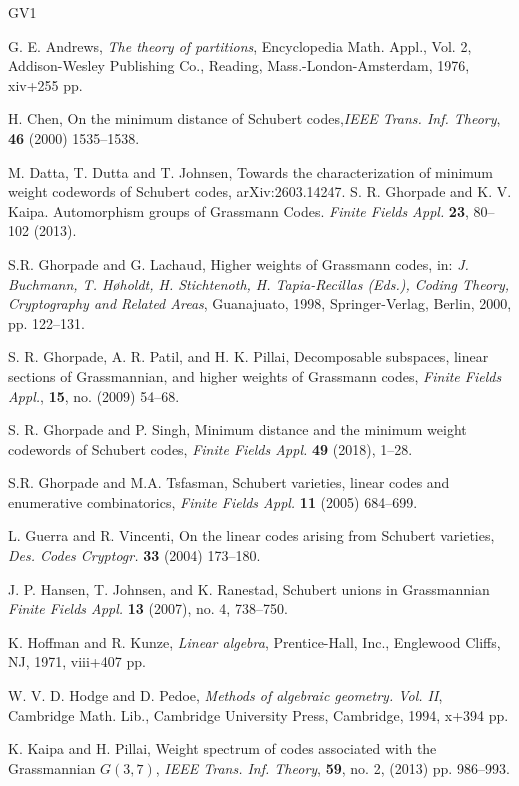 \documentclass[10pt,a4paper,oneside]{amsproc}
\begin{document}
\begin{thebibliography}{GV1}

G. E. Andrews,
\textit{The theory of partitions},
Encyclopedia Math. Appl., Vol. 2,
Addison-Wesley Publishing Co., Reading, Mass.-London-Amsterdam, 1976, xiv+255 pp.



H. Chen, On the minimum distance of Schubert codes,\emph{IEEE Trans. Inf. Theory}, {\bf 46} (2000) 1535–1538.


M. Datta, T. Dutta and T. Johnsen, Towards the characterization of minimum weight codewords of Schubert codes, arXiv:2603.14247.
S. R. Ghorpade and K. V. Kaipa. Automorphism groups of Grassmann Codes. \emph{Finite Fields Appl.} {\bf 23}, 80–102 (2013).

S.R. Ghorpade and G. Lachaud, Higher weights of Grassmann codes, in: \emph{J. Buchmann, T. Høholdt, H. Stichtenoth, H. Tapia-Recillas (Eds.), Coding Theory, Cryptography and Related Areas}, Guanajuato, 1998, Springer-Verlag, Berlin, 2000, pp. 122–131.

S. R. Ghorpade, A. R. Patil, and H. K. Pillai, Decomposable subspaces, linear sections of Grassmannian, and higher weights of Grassmann codes, \emph{Finite Fields Appl.},  {\bf 15}, no. (2009) 54–68. 


S. R. Ghorpade and P. Singh,
 Minimum distance and the minimum weight codewords of Schubert codes,
\emph{Finite Fields Appl.} {\bf 49} (2018), 1–28.


S.R. Ghorpade and M.A. Tsfasman, Schubert varieties, linear codes and enumerative combinatorics, \emph{Finite Fields Appl.} {\bf 11} (2005) 684–699. 

L. Guerra and R. Vincenti, On the linear codes arising from Schubert varieties, \emph{Des. Codes Cryptogr.} {\bf 33} (2004) 173–180.

J. P. Hansen, T. Johnsen, and K. Ranestad,
Schubert unions in Grassmannian
\emph{Finite Fields Appl.} {\bf 13} (2007), no. 4, 738–750.

K. Hoffman and R. Kunze,
\textit{Linear algebra},
Prentice-Hall, Inc., Englewood Cliffs, NJ, 1971, viii+407 pp.

W. V. D. Hodge and D. Pedoe,
\textit{Methods of algebraic geometry. Vol. II},
Cambridge Math. Lib.,
Cambridge University Press, Cambridge, 1994, x+394 pp.

K. Kaipa and H. Pillai, Weight spectrum of codes associated with the Grassmannian $G(3, 7)$, \emph{IEEE Trans. Inf. Theory}, {\bf 59}, no. 2, (2013) pp. 986–993.


\end{thebibliography}
\end{document}
